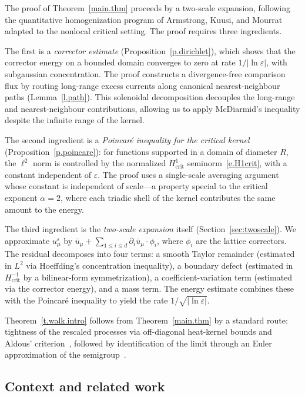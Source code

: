 \documentclass[11pt]{amsart}
\theoremstyle{plain}
\theoremstyle{definition}
\theoremstyle{remark}
\newcommand{\eps}{\varepsilon}
\begin{document}
	The proof of Theorem~\ref{main.thm} proceeds by a two-scale expansion, following the quantitative homogenization program of Armstrong, Kuusi, and Mourrat~\cite{ArmstrongKuusiMourrat2019} adapted to the nonlocal critical setting.
	The proof requires three ingredients.
	
	The first is a \emph{corrector estimate} (Proposition~\ref{p.dirichlet}), which shows that the corrector energy on a bounded domain converges to zero at rate $1/|\ln\eps|$, with subgaussian concentration.
	The proof constructs a divergence-free comparison flux by routing long-range excess currents along canonical nearest-neighbour paths (Lemma~\ref{l.path}).
	This solenoidal decomposition decouples the long-range and nearest-neighbour contributions, allowing us to apply McDiarmid's inequality despite the infinite range of the kernel.
	
	The second ingredient is a \emph{Poincar\'e inequality for the critical kernel} (Proposition~\ref{p.poincare}): for functions supported in a domain of diameter $R$, the $\ell^2$ norm is controlled by the normalized $H^1_{\mathrm{crit}}$ seminorm~\eqref{e.H1crit}, with a constant independent of $\eps$.
	The proof uses a single-scale averaging argument whose constant is independent of scale---a property special to the critical exponent $\alpha = 2$, where each triadic shell of the kernel contributes the same amount to the energy.
	
	The third ingredient is the \emph{two-scale expansion} itself (Section~\ref{sec:twoscale}).
	We approximate $u^\eps_\mu$ by $\bar u_\mu + \sum_{1 \le i \le d} \partial_i\bar u_\mu \cdot \phi_i$, where $\phi_i$ are the lattice correctors.
	The residual decomposes into four terms: a smooth Taylor remainder (estimated in $L^2$ via Hoeffding's concentration inequality), a boundary defect (estimated in $H^{-1}_{\mathrm{crit}}$ by a bilinear-form symmetrization), a coefficient-variation term (estimated via the corrector energy), and a mass term.
	The energy estimate combines these with the Poincar\'e inequality to yield the rate $1/\sqrt{\left| \ln\eps \right|}$.
	
	Theorem~\ref{t.walk.intro} follows from Theorem~\ref{main.thm} by a standard route: tightness of the rescaled processes via off-diagonal heat-kernel bounds and Aldous' criterion~\cite[Theorem~16.10]{Billingsley1999}, followed by identification of the limit through an Euler approximation of the semigroup~\cite[Theorem~1.6.1]{EthierKurtz1986}.
	
	\subsection{Context and related work}
	
\end{document}
